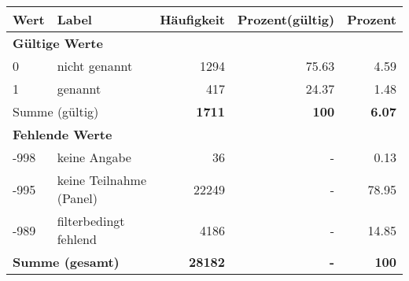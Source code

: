      \begin{longtable}{lXrrr}
     \toprule
     \textbf{Wert} & \textbf{Label} & \textbf{Häufigkeit} & \textbf{Prozent(gültig)} & \textbf{Prozent} \\
     \endhead
     \midrule
     \multicolumn{5}{l}{\textbf{Gültige Werte}}\\

     0 &
     \multicolumn{1}{X}{ nicht genannt   } &


       \num{1294} &
       \num[round-mode=places,round-precision=2]{75,63} &
         \num[round-mode=places,round-precision=2]{4,59} \\

     1 &
     \multicolumn{1}{X}{ genannt   } &


       \num{417} &
       \num[round-mode=places,round-precision=2]{24,37} &
         \num[round-mode=places,round-precision=2]{1,48} \\
     \midrule
     \multicolumn{2}{l}{Summe (gültig)} &
       \textbf{\num{1711}} &
     \textbf{100} &
       \textbf{\num[round-mode=places,round-precision=2]{6,07}} \\
     \multicolumn{5}{l}{\textbf{Fehlende Werte}}\\
       -998 &
       keine Angabe &
         \num{36} &
        - &
         \num[round-mode=places,round-precision=2]{0,13} \\
       -995 &
       keine Teilnahme (Panel) &
         \num{22249} &
        - &
         \num[round-mode=places,round-precision=2]{78,95} \\
       -989 &
       filterbedingt fehlend &
         \num{4186} &
        - &
         \num[round-mode=places,round-precision=2]{14,85} \\
     \midrule
     \multicolumn{2}{l}{\textbf{Summe (gesamt)}} &
          \textbf{\num{28182}} &
        \textbf{-} &
        \textbf{100} \\
     \bottomrule
     \end{longtable}
     
